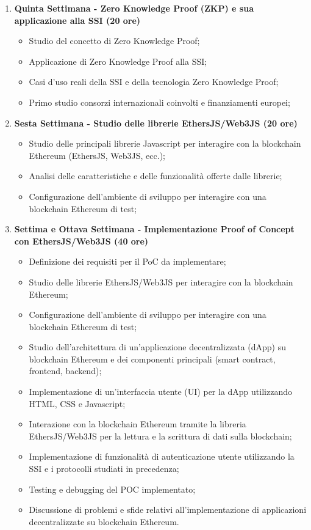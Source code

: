 {\begin{enumerate}
        \newpage 

        \item \textbf{Quinta Settimana - Zero Knowledge Proof (ZKP) e sua applicazione alla SSI (20 ore)}
        \begin{itemize}
            \item Studio del concetto di Zero Knowledge Proof;
            \item Applicazione di Zero Knowledge Proof alla SSI;
            \item Casi d'uso reali della SSI e della tecnologia Zero Knowledge Proof;
            \item Primo studio consorzi internazionali coinvolti e finanziamenti europei;
        \end{itemize}
        
        \item \textbf{Sesta Settimana - Studio delle librerie EthersJS/Web3JS (20 ore)}
        \begin{itemize}
            \item Studio delle principali librerie Javascript per interagire con la blockchain Ethereum (EthersJS, Web3JS, ecc.);
            \item Analisi delle caratteristiche e delle funzionalità offerte dalle librerie;
            \item Configurazione dell'ambiente di sviluppo per interagire con una blockchain Ethereum di test;
        \end{itemize}
        
        \item \textbf{Settima e Ottava Settimana - Implementazione Proof of Concept con EthersJS/Web3JS (40 ore)}
        \begin{itemize}
            \item Definizione dei requisiti per il PoC da implementare;
            \item Studio delle librerie EthersJS/Web3JS per interagire con la blockchain Ethereum;
            \item Configurazione dell'ambiente di sviluppo per interagire con una blockchain Ethereum di test;
            \item Studio dell'architettura di un'applicazione decentralizzata (dApp) su blockchain Ethereum e dei componenti principali (smart contract, frontend, backend);
            \item Implementazione di un'interfaccia utente (UI) per la dApp utilizzando HTML, CSS e Javascript;
            \item Interazione con la blockchain Ethereum tramite la libreria EthersJS/Web3JS per la lettura e la scrittura di dati sulla blockchain;
            \item Implementazione di funzionalità di autenticazione utente utilizzando la SSI e i protocolli studiati in precedenza;
            \item Testing e debugging del POC implementato;
            \item Discussione di problemi e sfide relativi all'implementazione di applicazioni decentralizzate su blockchain Ethereum.
        \end{itemize}


\end{enumerate}}
